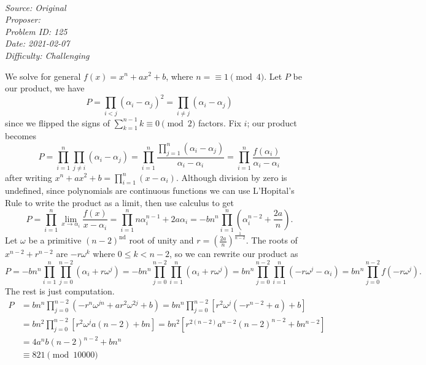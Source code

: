 \SSbreak\\
\emph{Source: Original}\\
\emph{Proposer: \Ptan}\\ %
\emph{Problem ID: 125}\\
\emph{Date: 2021-02-07}\\
\emph{Difficulty: Challenging}\\
\SSbreak

\bigskip

\begin{solution}\hfil\medskip
	
	We solve for general $f(x) = x^n + ax^2 + b$, where $n = \equiv 1 \pmod{4}$. Let $P$ be our product, we have 
	$$P = \prod_{i < j}\left(\alpha_i - \alpha_j\right)^2 = \prod_{i \neq j}\left(\alpha_i - \alpha_j\right)$$
	since we flipped the signs of $\sum_{k = 1}^{n - 1}k \equiv 0 \pmod{2}$ factors. Fix $i$; our product becomes
	$$P = \prod_{i = 1}^n \prod_{j \neq i} \left(\alpha_i - \alpha_j\right) 
	= \prod_{i = 1}^n \dfrac{\prod_{j = 1}^n \left(\alpha_i - \alpha_j\right)}{\alpha_i - \alpha_i} 
	= \prod_{i = 1}^n \dfrac{f\left(\alpha_i\right)}{\alpha_i - \alpha_i}$$
	after writing $x^n + ax^2 + b = \prod_{i = 1}^n \left(x - \alpha_i\right)$. Although division by zero is undefined, since polynomials are continuous functions
	we can use L'Hopital's Rule to write the product as a limit, then use calculus to get
	$$P = \prod_{i = 1}^n \lim_{x \to \alpha_i} \dfrac{f(x)}{x - \alpha_i} = \prod_{i = 1}^n n\alpha_i^{n - 1} + 2a\alpha_i 
	= -b n^n \prod_{i = 1}^n \left(\alpha_i^{n - 2} + \dfrac{2a}{n}\right).$$
	Let $\omega$ be a primitive $(n - 2)^\text{nd}$ root of unity and $r = \left(\frac{2a}{n}\right)^{\frac{1}{n - 2}}$. The roots of 
	$x^{n - 2} + r^{n - 2}$ are $-r\omega^k$ where $0 \leq k < n - 2$, so we can rewrite our product as
	$$P = -bn^n \prod_{i = 1}^n \prod_{j = 0}^{n - 2} \left(\alpha_i + r \omega^j\right) = -bn^n\prod_{j = 0}^{n - 2} \prod_{i = 1}^n \left(\alpha_i + r \omega^j\right)
	= bn^n\prod_{j = 0}^{n - 2} \prod_{i = 1}^n \left(-r \omega^j - \alpha_i\right) = bn^n \prod_{j = 0}^{n - 2} f\left(-r \omega^j\right).$$
	The rest is just computation.
	\begin{align*}
		P &= bn^n \prod_{j = 0}^{n - 2} \left(- r^n \omega^{jn} + ar^2 \omega^{2j} + b\right) = bn^n \prod_{j = 0}^{n - 2} \left[r^2 \omega^j \left(-r^{n - 2} + a\right) + b\right] \\
		&= bn^2 \prod_{j = 0}^{n - 2} \left[r^2 \omega^j a (n - 2) + bn\right] = bn^2 \left[r^{2(n - 2)} a^{n - 2} (n - 2)^{n - 2} + bn^{n - 2}\right] \\
		&= 4a^nb(n - 2)^{n - 2} + bn^n \\
		&\equiv \boxed{821} \pmod{10000}
	\end{align*}
\end{solution}\bigskip

